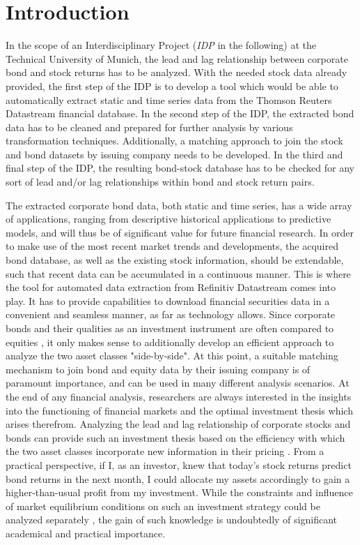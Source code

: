 \chapter{Introduction} \label{chapter:Introduction}
In the scope of an Interdisciplinary Project (\textit{IDP} in the following) at the Technical University of Munich, the lead and lag relationship between corporate bond and stock returns has to be analyzed. With the needed stock data already provided, the first step of the IDP is to develop a tool which would be able to automatically extract static and time series data from the Thomson Reuters Datastream financial database. In the second step of the IDP, the extracted bond data has to be cleaned and prepared for further analysis by various transformation techniques. Additionally, a matching approach to join the stock and bond datasets by issuing company needs to be developed. In the third and final step of the IDP, the resulting bond-stock database has to be checked for any sort of lead and/or lag relationships within bond and stock return pairs. 

The extracted corporate bond data, both static and time series, has a wide array of applications, ranging from descriptive historical applications to predictive models, and will thus be of significant value for future financial research. In order to make use of the most recent market trends and developments, the acquired bond database, as well as the existing stock information, should be extendable, such that recent data can be accumulated in a continuous manner. This is where the tool for automated data extraction from Refinitiv Datastream comes into play. It has to provide capabilities to download financial securities data in a convenient and seamless manner, as far as technology allows. Since corporate bonds and their qualities as an investment instrument are often compared to equities \cite{asset-management}, it only makes sense to additionally develop an efficient approach to analyze the two asset classes "side-by-side". At this point, a suitable matching mechanism to join bond and equity data by their issuing company is of paramount importance, and can be used in many different analysis scenarios. At the end of any financial analysis, researchers are always interested in the insights into the functioning of financial markets and the optimal investment thesis which arises therefrom. Analyzing the lead and lag relationship of corporate stocks and bonds can provide such an investment thesis based on the efficiency with which the two asset classes incorporate new information in their pricing \cite{lead-lag-source}. From a practical perspective, if I, as an investor, knew that today's stock returns predict bond returns in the next month, I could allocate my assets accordingly to gain a higher-than-usual profit from my investment. While the constraints and influence of market equilibrium conditions on such an investment strategy could be analyzed separately \cite{asset-management}, the gain of such knowledge is undoubtedly of significant academical and practical importance. 


